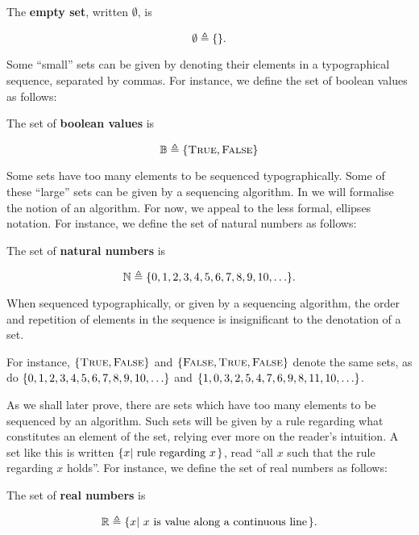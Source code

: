 \begin{definition} The \textbf{empty set}, written $\emptyset$, is

$$\emptyset\triangleq\mathopen{}\left\{{}\right\}\mathclose{}.$$

\end{definition}

Some ``small'' sets can be given by denoting their elements in a typographical
sequence, separated by commas. For instance, we define the set of boolean
values as follows:

\begin{definition} The set of \textbf{boolean values} is

$$\mathbb{B}\triangleq\mathopen{}\left\{{\text{\textsc{True}},\text{\textsc{False}}}\right\}\mathclose{}$$

\end{definition}

Some sets have too many elements to be sequenced typographically. Some of these
``large'' sets can be given by a sequencing algorithm. In
 we will formalise the notion of an
algorithm. For now, we appeal to the less formal, ellipses notation. For
instance, we define the set of natural numbers as follows:

\begin{definition} The set of \textbf{natural numbers} is

$$\mathbb{N} \triangleq \mathopen{}\left\{{0,1,2,3,4,5,6,7,8,9,10,\ldots}\right\}\mathclose{}.$$

\end{definition}

\begin{remark} When sequenced typographically, or given by a sequencing
algorithm, the order and repetition of elements in the sequence is
insignificant to the denotation of a set. \end{remark}

For instance, $\mathopen{}\left\{{\text{\textsc{True}},\text{\textsc{False}}}\right\}\mathclose{}$ and $\mathopen{}\left\{{\text{\textsc{False}}, \text{\textsc{True}}, \text{\textsc{False}}}\right\}\mathclose{}$
denote the same sets, as do $\mathopen{}\left\{{0,1,2,3,4,5,6,7,8,9,10,\ldots}\right\}\mathclose{}$ and
$\mathopen{}\left\{{1,0,3,2,5,4,7,6,9,8,11,10,\ldots}\right\}\mathclose{}$.

As we shall later prove, there are sets which have too many elements to be
sequenced by an algorithm.  Such sets will be given by a rule regarding what
constitutes an element of the set, relying ever more on the reader's intuition.
A set like this is written $\mathopen{}\left\{{x\mathopen{}\left|\ {\text{rule regarding $x$}}\right.\mathclose{}}\right\}\mathclose{}$, read ``all
$x$ such that the rule regarding $x$ holds''. For instance, we define the set
of real numbers as follows:

\begin{definition} The set of \textbf{real numbers} is

$$\mathbb{R}\triangleq\mathopen{}\left\{{x\mathopen{}\left|\ {\text{$x$ is value along a continuous
line}}\right.\mathclose{}}\right\}\mathclose{}.$$

\end{definition}

